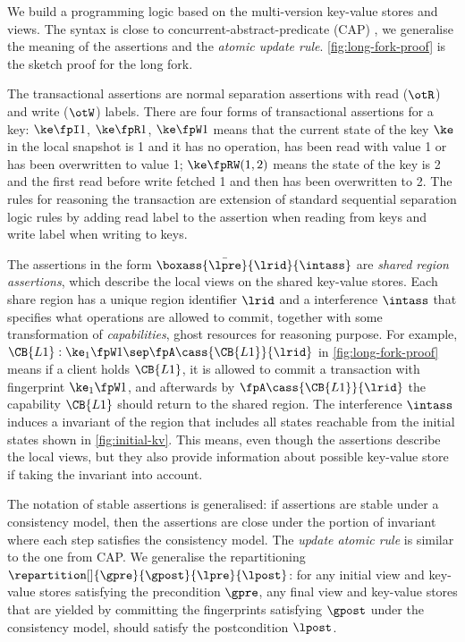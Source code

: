 

We build a programming logic based on the multi-version key-value stores and views.
The syntax is close to concurrent-abstract-predicate (CAP) \cite{cap}, 
we generalise the meaning of the assertions and the \emph{atomic update rule}.
\cref{fig:long-fork-proof} is the sketch proof for the long fork.

The transactional assertions are normal separation assertions with read (\(\otR\)) and write (\(\otW\)) labels.
There are four forms of transactional assertions for a key:
\( \ke \fpI 1 \), \( \ke \fpR 1\), \( \ke \fpW 1 \) means that the current state of the key \( \ke \) 
in the local snapshot is 1 and it has no operation, has been read with value 1 or has been overwritten to value 1;
\( \ke \fpRW (1,2) \) means the state of the key is 2 and 
the first read before write fetched 1 and then has been overwritten to 2.
The rules for reasoning the transaction are extension of standard sequential separation logic rules by 
adding read label to the assertion when reading from keys and write label when writing to keys.

The assertions in the form \( \boxass{\bar{\lpre}}{\lrid}{\intass}\) 
are \emph{shared region assertions}, which describe the local views on the shared key-value stores.
Each share region has a unique region identifier \( \lrid \) and a interference \( \intass \)
that specifies what operations are allowed to commit, 
together with some transformation of \emph{capabilities}, ghost resources for reasoning purpose.
For example, \( \CB{L1}  :  \ke_1 \fpW 1 \sep \null \fpA \cass{\CB{L1}}{\lrid} \) in \cref{fig:long-fork-proof} 
means if a client holds \( \CB{L1} \), it is allowed to commit a transaction with fingerprint \(  \ke_1 \fpW 1 \),
and afterwards by \( \null \fpA \cass{\CB{L1}}{\lrid}\) the capability \( \CB{L1} \) should return to the shared region.
The interference \( \intass \)  induces a invariant of the region that 
includes all states reachable from the initial states shown in \cref{fig:initial-kv}.
This means, even though the assertions describe the local views, but they also provide information about possible key-value store
if taking the invariant into account.

The notation of stable assertions is generalised: if assertions are stable under a consistency model,  
then the assertions are close under the portion of invariant where each step satisfies the consistency model.
The \emph{update atomic rule} is similar to the one from CAP.
We generalise the repartitioning \( \repartition[]{\gpre}{\gpost}{\lpre}{\lpost}\):
for any initial view and key-value stores satisfying the precondition \( \gpre \),
any final view and key-value stores that are yielded by committing the fingerprints satisfying \( \gpost \) under the consistency model, should satisfy the postcondition \( \lpost \).


